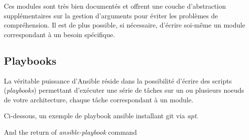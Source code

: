 \bigskip

Ces modules sont très bien documentés et offrent une couche
d'abstraction supplémentaires sur la gestion d'arguments pour éviter les
problèmes de compréhension. Il est de plus possible, si nécessaire,
d'écrire soi-même un module correspondant à un besoin spécifique.

\newpage

\subsection{Playbooks}\label{playbooks}

La véritable puissance d'Ansible réside dans la possibilité d'écrire des
scripts (\emph{playbooks}) permettant d'exécuter une série de tâches sur
un ou plusieurs noeuds de votre architecture, chaque tâche correspondant
à un module.

\bigskip

Ci-dessous, un exemple de playbook ansible installant git via
\emph{apt}.

\begin{Shaded}
\begin{Highlighting}[]

\KeywordTok{-}  
    \KeywordTok{-}  
       
       
\end{Highlighting}
\end{Shaded}

And the return of \emph{ansible-playbook} command

\bigskip

\begin{Shaded}
\begin{Highlighting}[]
 \NormalTok{**********************************************************}

 \NormalTok{[setup] **************************************************}

 

 
       
\end{Highlighting}
\end{Shaded}

